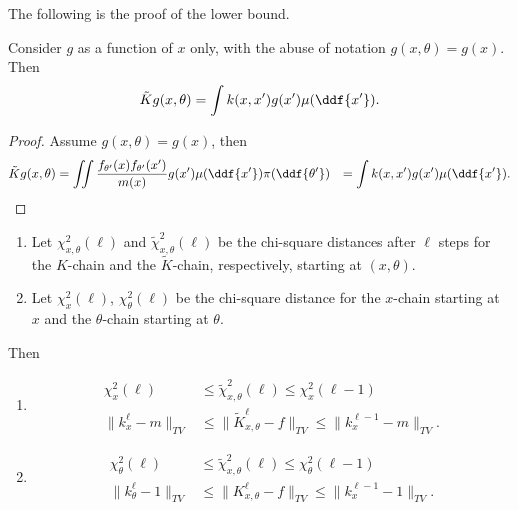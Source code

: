 \documentclass[12pt]{article}
\begin{document}
The following is the proof of the lower bound.
\begin{lemma}
    Consider \( g \) as a function of \( x \) only, with the abuse of
    notation \( g(x,\theta) = g(x) \).  Then
    \[
        \tilde{K}g(x,\theta) = \int k(x,x') g(x')\mu(\ddf{x'}).
    \]
\end{lemma}

\begin{proof}
    Assume \( g(x,\theta) = g(x) \), then
    \begin{align*}
        \tilde{K}g(x,\theta) &= \iint \frac{f_{\theta'}(x) f_{\theta'}(x')}
        {m(x)} g(x')\mu(\ddf{x'}) \pi(\ddf{\theta'}) &= \int k(x,x') g(x')
        \mu(\ddf{x'}).
    \end{align*}
\end{proof}

\begin{lemma}
    \begin{enumerate}
        \item
            Let \( \chi_{x,\theta}^2(\ell) \) and \( \tilde{\chi}_{x,\theta}^2
            (\ell) \) be the chi-square distances after \( \ell \) steps
            for the \( K \)-chain and the \( \tilde{K} \)-chain,
            respectively, starting at \( (x,\theta) \).
        \item
            Let \( \chi_x^2(\ell) \), \( \chi_{\theta}^2(\ell) \) be the
            chi-square distance for the \( x \)-chain starting at \( x \)
            and the \( \theta \)-chain starting at \( \theta \).
    \end{enumerate}
    Then
    \begin{enumerate}
        \item
            \begin{align*}
                \chi_x^2(\ell) &\le \tilde{\chi}_{x,\theta}^2(\ell) \le
                \chi_x^2(\ell-1) \\
                \| k_x^{\ell} - m \|_{TV} &\le \| \tilde{K}_{x,\theta}^{\ell}
                - f \|_{TV} \le \| k_x^{\ell-1} - m \|_{TV}.
            \end{align*}
        \item
            \begin{align*}
                \chi_{\theta}^2(\ell) &\le \tilde{\chi}_{x,\theta}^2(\ell)
                \le \chi_{\theta}^2(\ell-1) \\
                \| k_{\theta}^{\ell} - 1 \|_{TV} &\le \| K_{x,\theta}^{\ell}
                - f \|_{TV} \le \| k_x^{\ell-1} - 1 \|_{TV}.
            \end{align*}
    \end{enumerate}
\end{lemma}
\end{document}
